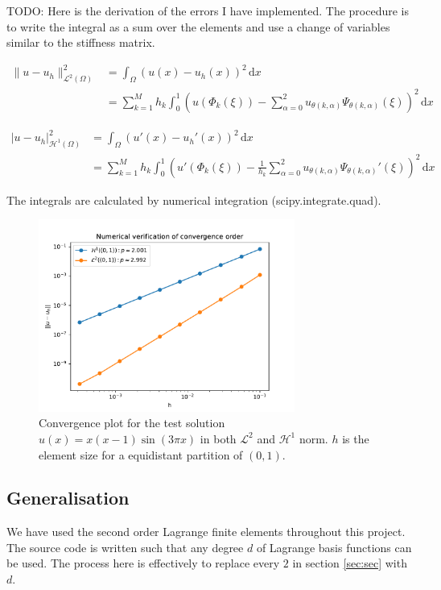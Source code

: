 TODO: Here is the derivation of the errors I have implemented.
The procedure is to write the integral as a sum over the elements
and use a change of variables similar to the stiffness matrix.

\begin{align}
  \lVert u - u_h \rVert_{\mathcal{L}^2(\Omega)}^2 
    &= \int_{\Omega}(u(x) - u_h(x))^2 \,\mathrm{d}x \\
    &= \sum_{k=1}^{M} h_k \int_{0}^{1}
    \left(
    u(\Phi_k(\xi)) 
      - \sum_{\alpha=0}^{2} u_{\theta(k, \alpha)} \Psi_{\theta(k, \alpha)}(\xi)
    \right)^2 \,\mathrm{d}x
\end{align}

\begin{align}
  \lvert u - u_h \rvert_{\mathcal{H}^1(\Omega)}^2 
    &= \int_{\Omega}(u'(x) - u_h'(x))^2 \,\mathrm{d}x \\
    &= \sum_{k=1}^{M} h_k \int_{0}^{1}
    \left(
    u'(\Phi_k(\xi)) 
      - \frac{1}{h_k} \sum_{\alpha=0}^{2} u_{\theta(k, \alpha)} \Psi_{\theta(k, \alpha)}'(\xi)
    \right)^2 \,\mathrm{d}x
\end{align}

The integrals are calculated by
numerical integration (scipy.integrate.quad).


\begin{figure}
  \centering
  \includegraphics[width=0.75\textwidth]{Images/plots/task1_conv_plot.pdf}
  \caption{Convergence plot for the test solution
  \( u(x) = x(x-1)\sin(3\pi x) \) in both
  \( \mathcal{L}^2 \) and \( \mathcal{H}^1 \) norm.
\( h \) is the element size for a equidistant partition of \( (0, 1) \).}
  \label{fig:conv_plot}
\end{figure}

\subsection{Generalisation}

We have used the second order Lagrange finite elements
throughout this project. The source code is written
such that any degree \( d \) of Lagrange basis functions can be used.
The process here is effectively to replace every 
\( 2 \) in section \ref{sec:sec} with \( d \).

